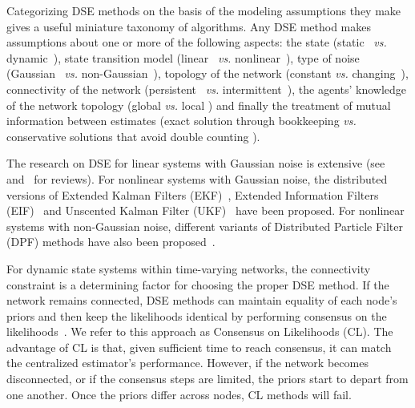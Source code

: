 \documentclass[journal]{IEEEtran}
\theoremstyle{remark}
\theoremstyle{definition}
\begin{document}
Categorizing DSE methods on the basis of the
modeling assumptions they make gives a 
useful miniature taxonomy of algorithms. Any DSE method makes assumptions about one or
more of the following aspects: the state (static~\cite{xiao2005scheme} \emph{vs.}
dynamic~\cite{simonetto10distributed}), state transition model
(linear~\cite{olfati2005distributed} \emph{vs.}
nonlinear~\cite{battistelli2014parallel,rao2003constrained,boem2013distributed,hu2014state}),
type of noise (Gaussian~\cite{xiao2005scheme,olfati2005distributed} \emph{vs.}
non-Gaussian~\cite{hlinka2013distributed}), topology of the network (constant
\emph{vs.} changing~\cite{tamjidi2016unifying,xiao2005scheme}), connectivity of the
network (persistent~\cite{battistelli2014parallel} \emph{vs.}
intermittent~\cite{tamjidi2016unifying,xiao2005scheme}), the agents' knowledge
of the network topology (global \emph{vs.} local
\cite{tamjidi2016unifying,xiao2005scheme,battistelli2014parallel}) and finally
the treatment of mutual information between estimates (exact solution through
bookkeeping \cite{durrant2001data} \emph{vs.} conservative solutions that avoid double
counting \cite{wang_distr_CI,hu2012diffusion}).

The research on DSE for linear systems with Gaussian noise is extensive
(see~\cite{olfati2005distributed} and~\cite{cattivelli2010diffusion} for
reviews).  For nonlinear systems with Gaussian noise, the distributed versions
of Extended Kalman Filters (EKF)~\cite{battistelli2016stability,
 battistelli2014parallel}, Extended Information Filters
(EIF)~\cite{dist_inf_filter_2009} and Unscented Kalman Filter
(UKF)~\cite{niu2017distributed} have been proposed.  For nonlinear systems with
non-Gaussian noise, different variants of Distributed Particle Filter (DPF)
methods have also been proposed~\cite{lin_dist_part_filter_2014}. 

For dynamic state systems within time-varying networks, the connectivity
constraint is a determining factor for choosing the proper DSE method. If the
network remains connected, DSE methods can maintain equality of each node's
priors and then keep the likelihoods identical by performing consensus on the
likelihoods~\cite{hlinka2012likelihood,li2012distributed}.  We refer to this
approach as Consensus on Likelihoods (CL). The advantage of CL is that, given
sufficient time to reach consensus, it can match the centralized estimator's
performance.  However, if the network becomes disconnected, or if the  consensus steps are limited, the priors start to
depart from one another. Once the priors differ across nodes, CL methods will
fail.
\end{document}
